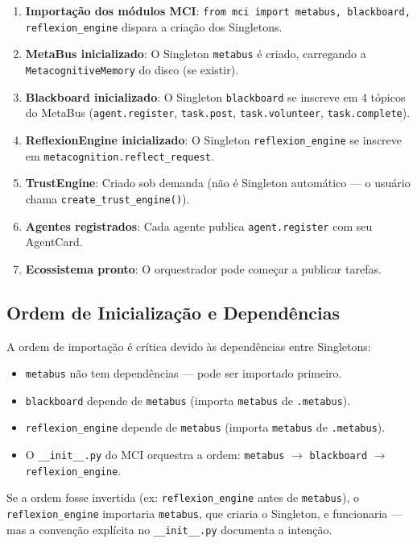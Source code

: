 \begin{enumerate}
    \item \textbf{Importação dos módulos MCI}: \texttt{from mci import metabus, blackboard, reflexion\_engine} dispara a criação dos Singletons.
    \item \textbf{MetaBus inicializado}: O Singleton \texttt{metabus} é criado, carregando a \texttt{MetacognitiveMemory} do disco (se existir).
    \item \textbf{Blackboard inicializado}: O Singleton \texttt{blackboard} se inscreve em 4 tópicos do MetaBus (\texttt{agent.register}, \texttt{task.post}, \texttt{task.volunteer}, \texttt{task.complete}).
    \item \textbf{ReflexionEngine inicializado}: O Singleton \texttt{reflexion\_engine} se inscreve em \texttt{metacognition.reflect\_request}.
    \item \textbf{TrustEngine}: Criado sob demanda (não é Singleton automático — o usuário chama \texttt{create\_trust\_engine()}).
    \item \textbf{Agentes registrados}: Cada agente publica \texttt{agent.register} com seu AgentCard.
    \item \textbf{Ecossistema pronto}: O orquestrador pode começar a publicar tarefas.
\end{enumerate}

\subsection{Ordem de Inicialização e Dependências}

A ordem de importação é crítica devido às dependências entre Singletons:

\begin{itemize}
    \item \texttt{metabus} não tem dependências — pode ser importado primeiro.
    \item \texttt{blackboard} depende de \texttt{metabus} (importa \texttt{metabus} de \texttt{.metabus}).
    \item \texttt{reflexion\_engine} depende de \texttt{metabus} (importa \texttt{metabus} de \texttt{.metabus}).
    \item O \texttt{\_\_init\_\_.py} do MCI orquestra a ordem: \texttt{metabus} $\rightarrow$ \texttt{blackboard} $\rightarrow$ \texttt{reflexion\_engine}.
\end{itemize}

Se a ordem fosse invertida (ex: \texttt{reflexion\_engine} antes de \texttt{metabus}), o \texttt{reflexion\_engine} importaria \texttt{metabus}, que criaria o Singleton, e funcionaria — mas a convenção explícita no \texttt{\_\_init\_\_.py} documenta a intenção.

